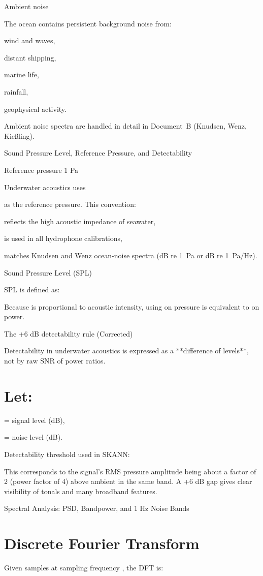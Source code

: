 \documentclass[12pt]{article}
\begin{document}
Ambient noise

The ocean contains persistent background noise from:

wind and waves,

distant shipping,

marine life,

rainfall,

geophysical activity.

Ambient noise spectra are handled in detail in Document B (Knudsen, Wenz, Kießling).

Sound Pressure Level, Reference Pressure, and Detectability

Reference pressure 1 Pa

Underwater acoustics uses


as the reference pressure. This convention:

reflects the high acoustic impedance of seawater,

is used in all hydrophone calibrations,

matches Knudsen and Wenz ocean-noise spectra (dB re 1 Pa or dB re 1 Pa/Hz).

Sound Pressure Level (SPL)

SPL is defined as:


Because  is proportional to acoustic intensity, using  on pressure is equivalent to  on power.

The +6 dB detectability rule (Corrected)

Detectability in underwater acoustics is expressed as a **difference of levels**, not by raw SNR of power ratios.

\section*{Let:}
= signal level (dB),

= noise level (dB).

Detectability threshold used in SKANN:


This corresponds to the signal’s RMS pressure amplitude being about a factor of 2 (power factor of 4) above ambient in the same band. A +6 dB gap gives clear visibility of tonals and many broadband features.

Spectral Analysis: PSD, Bandpower, and 1 Hz Noise Bands

\section*{Discrete Fourier Transform}
Given  samples at sampling frequency , the DFT is:
\end{document}
